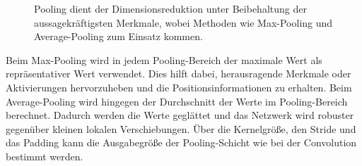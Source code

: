 \begin{figure}[htbp]
    \hspace{0cm}
    \vspace{0cm}
    \caption{Pooling dient der Dimensionsreduktion unter Beibehaltung der aussagekräftigsten Merkmale, wobei Methoden wie Max-Pooling und Average-Pooling zum Einsatz kommen.}
    \label{fig:pad}
\end{figure}
Beim Max-Pooling wird in jedem Pooling-Bereich der maximale Wert als repräsentativer Wert verwendet. Dies hilft dabei, herausragende Merkmale oder Aktivierungen hervorzuheben und die Positionsinformationen zu erhalten.
Beim Average-Pooling wird hingegen der Durchschnitt der Werte im Pooling-Bereich berechnet. Dadurch werden die Werte geglättet und das Netzwerk wird robuster gegenüber kleinen lokalen Verschiebungen.
Über die Kernelgröße, den Stride und das Padding kann die Ausgabegröße der Pooling-Schicht wie bei der Convolution bestimmt werden.
\clearpage
